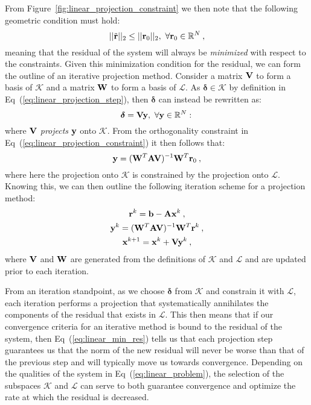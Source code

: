 From Figure~\ref{fig:linear_projection_constraint} we then note that
the following geometric condition must hold:
\begin{equation}
  ||\tilde{\ve{r}}||_2 \leq ||\ve{r}_0||_2,\ \forall \ve{r}_0 \in
  \mathbb{R}^N\:,
  \label{eq:linear_min_res}
\end{equation}
meaning that the residual of the system will always be
\textit{minimized} with respect to the constraints.
Given this minimization condition for the residual, we can form the
outline of an iterative projection method. Consider a matrix $\mathbf{V}$
to form a basis of $\mathcal{K}$ and a matrix $\mathbf{W}$ to form a basis
of $\mathcal{L}$. As $\boldsymbol{\delta} \in \mathcal{K}$ by
definition in Eq~(\ref{eq:linear_projection_step}), then
$\boldsymbol{\delta}$ can instead be rewritten as:
\begin{equation}
  \boldsymbol{\delta} = \mathbf{V}\mathbf{y},\ \forall \mathbf{y} \in \mathbb{R}^N:\,
  \label{eq:linear_delta_projection}
\end{equation}
where $\mathbf{V}$ \textit{projects} $\mathbf{y}$ onto $\mathcal{K}$. From the
orthogonality constraint in Eq~(\ref{eq:linear_projection_constraint})
it then follows that:
\begin{equation}
  \mathbf{y} = (\mathbf{W}^T\mathbf{A}\mathbf{V})^{-1}\mathbf{W}^T\mathbf{r}_0\:,
  \label{eq:linear_constraint_projection}
\end{equation}
where here the projection onto $\mathcal{K}$ is constrained by the
projection onto $\mathcal{L}$. Knowing this, we can then outline the
following iteration scheme for a projection method:
\begin{subequations}
  \begin{gather}
    \mathbf{r}^k = \mathbf{b} - \mathbf{A}\mathbf{x}^k\:,\\  
    \mathbf{y}^k = (\mathbf{W}^T\mathbf{A}\mathbf{V})^{-1}\mathbf{W}^T\mathbf{r}^k\:,\\
    \mathbf{x}^{k+1} = \mathbf{x}^k + \mathbf{V}\mathbf{y}^k\:,
  \end{gather}
  \label{eq:linear_projection_iteration}
\end{subequations}
where $\mathbf{V}$ and $\mathbf{W}$ are generated from the definitions of
$\mathcal{K}$ and $\mathcal{L}$ and are updated prior to each
iteration.

From an iteration standpoint, as we choose $\boldsymbol{\delta}$ from
$\mathcal{K}$ and constrain it with $\mathcal{L}$, each iteration
performs a projection that systematically annihilates the components of
the residual that exists in $\mathcal{L}$. This then means that if our
convergence criteria for an iterative method is bound to the residual
of the system, then Eq~(\ref{eq:linear_min_res}) tells us that each
projection step guarantees us that the norm of the new residual will
never be worse than that of the previous step and will typically move
us towards convergence. Depending on the qualities of the system in
Eq~(\ref{eq:linear_problem}), the selection of the subspaces
$\mathcal{K}$ and $\mathcal{L}$ can serve to both guarantee
convergence and optimize the rate at which the residual is decreased.

